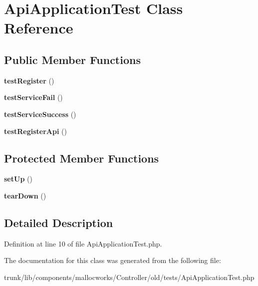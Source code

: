 \hypertarget{class_api_application_test}{
\section{ApiApplicationTest Class Reference}
\label{class_api_application_test}
}
\subsection*{Public Member Functions}
\begin{DoxyCompactItemize}
\item 
\hypertarget{class_api_application_test_a21ba109cac25766104644b11982265e1}{
{\bfseries testRegister} ()}
\label{class_api_application_test_a21ba109cac25766104644b11982265e1}

\item 
\hypertarget{class_api_application_test_a6010f2628af6666b95f677a5accf6e16}{
{\bfseries testServiceFail} ()}
\label{class_api_application_test_a6010f2628af6666b95f677a5accf6e16}

\item 
\hypertarget{class_api_application_test_a4867aec4c13f10f14c808cbdb9d34dd2}{
{\bfseries testServiceSuccess} ()}
\label{class_api_application_test_a4867aec4c13f10f14c808cbdb9d34dd2}

\item 
\hypertarget{class_api_application_test_af58097385dc18a259b16152b15cdb306}{
{\bfseries testRegisterApi} ()}
\label{class_api_application_test_af58097385dc18a259b16152b15cdb306}

\end{DoxyCompactItemize}
\subsection*{Protected Member Functions}
\begin{DoxyCompactItemize}
\item 
\hypertarget{class_api_application_test_a0bc688732d2b3b162ffebaf7812e78da}{
{\bfseries setUp} ()}
\label{class_api_application_test_a0bc688732d2b3b162ffebaf7812e78da}

\item 
\hypertarget{class_api_application_test_a80fe3d17e658907fc75346a0ec9d6fc7}{
{\bfseries tearDown} ()}
\label{class_api_application_test_a80fe3d17e658907fc75346a0ec9d6fc7}

\end{DoxyCompactItemize}


\subsection{Detailed Description}


Definition at line 10 of file ApiApplicationTest.php.



The documentation for this class was generated from the following file:\begin{DoxyCompactItemize}
\item 
trunk/lib/components/mallocworks/Controller/old/tests/ApiApplicationTest.php\end{DoxyCompactItemize}
